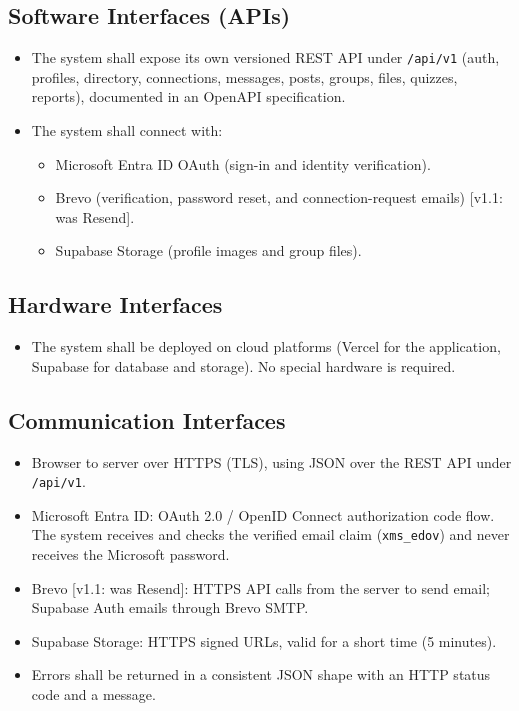 \documentclass[10pt,a4paper]{article}
\newcommand{\vone}[1]{\textcolor{accent}{\small[v1.1: #1]}}
\begin{document}
\subsection{Software Interfaces (APIs)}
\begin{itemize}
\item The system shall expose its own versioned REST API under \texttt{/api/v1} (auth, profiles, directory, connections, messages, posts, groups, files, quizzes, reports), documented in an OpenAPI specification.
\item The system shall connect with:
  \begin{itemize}
  \item Microsoft Entra ID OAuth (sign-in and identity verification).
  \item Brevo (verification, password reset, and connection-request emails) \vone{was Resend}.
  \item Supabase Storage (profile images and group files).
  \end{itemize}
\end{itemize}
\subsection{Hardware Interfaces}
\begin{itemize}
\item The system shall be deployed on cloud platforms (Vercel for the application, Supabase for database and storage). No special hardware is required.
\end{itemize}
\subsection{Communication Interfaces}
\begin{itemize}
\item Browser to server over HTTPS (TLS), using JSON over the REST API under \texttt{/api/v1}.
\item Microsoft Entra ID: OAuth 2.0 / OpenID Connect authorization code flow. The system receives and checks the verified email claim (\texttt{xms\_edov}) and never receives the Microsoft password.
\item Brevo \vone{was Resend}: HTTPS API calls from the server to send email; Supabase Auth emails through Brevo SMTP.
\item Supabase Storage: HTTPS signed URLs, valid for a short time (5 minutes).
\item Errors shall be returned in a consistent JSON shape with an HTTP status code and a message.
\end{itemize}
\end{document}
